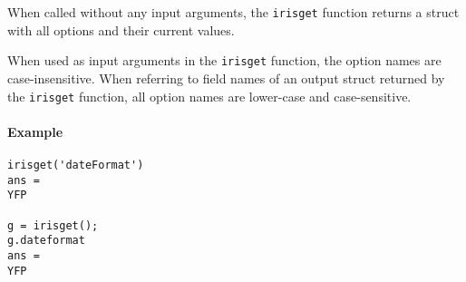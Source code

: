 When called without any input arguments, the \texttt{irisget} function
returns a struct with all options and their current values.

When used as input arguments in the \texttt{irisget} function, the
option names are case-insensitive. When referring to field names of an
output struct returned by the \texttt{irisget} function, all option
names are lower-case and case-sensitive.

\paragraph{Example}\label{example}

\begin{verbatim}
irisget('dateFormat')
ans =
YFP

g = irisget();
g.dateformat
ans =
YFP
\end{verbatim}


